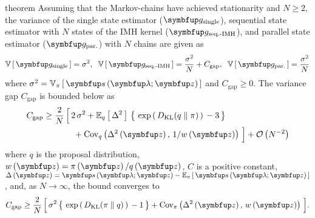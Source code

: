 
\begin{theoremEnd}{theorem}\label{thm:var}
  Assuming that the Markov-chains have achieved stationarity and \(N \geq 2\), the variance of the single state estimator (\(\vg_{\text{single}}\)), sequential state estimator with \(N\) states of the IMH kernel (\(\vg_{\text{seq.-IMH}}\)), and parallel state estimator (\(\vg_{\text{par.}}\)) with \(N\) chains are given as 
  \vspace{-0.08in}
  {\small
  \begin{align*}
    \V{\vg_{\text{single}}}   = \sigma^2,\;\;
    \V{\vg_{\text{seq.-IMH}}}  = \frac{\sigma^2}{N} + C_{\text{gap}},\;\;
    \V{\vg_{\text{par.}}}    = \frac{\sigma^2}{N}
  \end{align*}
  }%
  where \(\sigma^2 = \Vsub{\pi}{\vs\left(\vlambda; \vz\right)} \) and \(C_{\text{gap}} \geq 0\).
  The variance gap \(C_{\text{gap}}\) is bounded below as
  \vspace{-0.05in}
  {\small
  \begin{align*}
    C_{\text{gap}}
    \geq
    \frac{2}{N} \, \Big[\,
    &2\,\sigma^2
    +
    \Esub{q}{\Delta^2} \, \big\{\,
    \exp\,(\,
    \DKL{q}{\pi}
    \,)\,
    -
    3
    \,\big\}
    \\
    &\; +
    \text{Cov}_{q}\left(\Delta^2\left(\vz\right),\, 1/ w\left(\vz\right) \right)
    \,\Big]
    +
    \mathcal{O}\left(N^{-2}\right)
  \end{align*}
  }%
  where \(q\) is the proposal distribution, \(w\left(\vz\right)=\pi\left(\vz\right)/q\left(\vz\right)\), \(C\) is a positive constant, \(\Delta\left(\vz\right) = \vs\left(\vlambda;\vz\right) - \Esub{\pi}{\vs\left(\vlambda;\vz\right)}\),
  and, as \(N \rightarrow \infty\), the bound converges to
  \vspace{-0.05in}
  {\small
  \begin{align*}
    C_{\text{gap}}
    \geq
    \frac{2}{N} \, \Big[\,
    \sigma^2 \, \big\{\,
    \exp\,(\,
    \DKL{\pi}{q}
    \,)\,
    -
    1
    \,\big\}
     +
    \text{Cov}_{\pi}\left(\Delta^2\left(\vz\right),\, w\left(\vz\right) \right)
    \,\Big].
  \end{align*}
  }
\end{theoremEnd}
%
